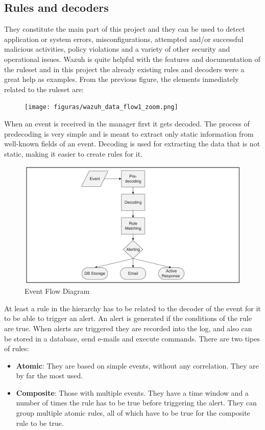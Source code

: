 \subsection{Rules and decoders}
They constitute the main part of this project and they can be used to detect application or system errors, misconfigurations, attempted and/or successful malicious activities, policy violations and a variety of other security and operational issues\cite{wazuh_index}. Wazuh is quite helpful with the features and documentation of the ruleset and in this project the already existing rules and decoders were a great help as examples.
\linej
\linej
From the previous figure, the elements inmediately related to the ruleset are:
\begin{figure}[H]
  \centering
	\texttt{[image: figuras/wazuh\_data\_flow1\_zoom.png]}
\end{figure}
\linej
When an event is received in the manager first it gets decoded. The process of predecoding is very simple and is meant to extract only static information from well-known fields of an event.
Decoding is used for extracting the data that is not static, making it easier to create rules for it.
\begin{figure}[H]
  \centering
	\includegraphics[width=\textwidth]{figuras/Event_Flow.png}
	\caption{Event Flow Diagram\cite{libro_ossec}}
\end{figure}
\linej
At least a rule in the hierarchy has to be related to the decoder of the event for it to be able to trigger an alert. An alert is generated if the conditions of the rule are true.
\linej
When alerts are triggered they are recorded into the log, and also can be stored in a database, send e-mails and execute commands\cite{libro_ossec}.
\linej
\linej
There are two tipes of rules\cite{libro_ossec}:
\begin{itemize}
	\item \textbf{Atomic}: They are based on simple events, without any correlation. They are by far the most used.
	\item \textbf{Composite}: Those with multiple events. They have a time window and a number of times the rule has to be true before triggering the alert. They can group multiple atomic rules, all of which have to be true for the composite rule to be true.
\end{itemize}
